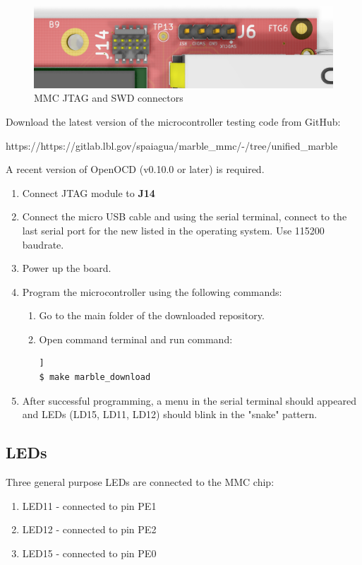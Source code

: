 \documentclass[12pt,oneside,a4]{article}
\begin{document}
\begin{figure}[H]
\begin{center}
\includegraphics[width=1\linewidth]{mmcjtagswd.png}
 \caption{MMC JTAG and SWD connectors}\label{mmcjtagswd}
\end{center}
\end{figure}

Download the latest version of the microcontroller testing code from GitHub:
\begin{leftbar}
https://https://gitlab.lbl.gov/spaiagua/marble\_mmc/-/tree/unified\_marble
\end{leftbar}

A recent version of OpenOCD (v0.10.0 or later) is required.
\begin{enumerate}
	\item Connect JTAG module to \textbf{J14}
	\item Connect the micro USB cable and using the serial terminal, connect to the last serial port for the new listed in the operating system. Use 115200 baudrate.
	\item Power up the board.
	\item Program the microcontroller using the following commands:
	\begin{enumerate}
	\item Go to the main folder of the downloaded repository.
	\item Open command terminal and run command:
	\begin{lstlisting}[backgroundcolor = \color{Gainsboro}, language=bash, frame=none]]
$ make marble_download
	\end{lstlisting}
	\end{enumerate}
	\item After successful programming, a menu in the serial terminal should appeared and LEDs (LD15, LD11, LD12) should blink in the "snake" pattern.
\end{enumerate}
\subsection{LEDs}
Three general purpose LEDs are connected to the MMC chip:
\begin{enumerate}
	\item LED11 - connected to pin PE1
	\item LED12 - connected to pin PE2
	\item LED15 - connected to pin PE0
\end{enumerate}
\end{document}
